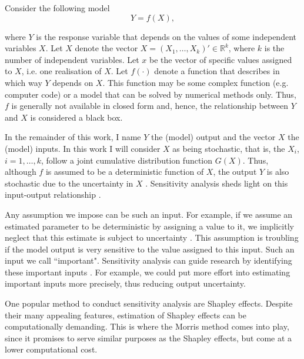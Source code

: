 
\noindent Consider the following model
\begin{equation*}
Y = f(X),
\end{equation*}

\noindent where $Y$ is the response variable that depends on the values of some independent variables $X$. Let $X$ denote the vector $X = (X_1, \dots, X_k)' \in \mathbb{R}^k$, where $k$ is the number of independent variables. Let $x$ be the vector of specific values assigned to $X$, i.e. one realisation of $X$. Let $f(\cdot)$ denote a function that describes in which way $Y$ depends on $X$. This function may be some complex function (e.g. computer code) or a model that can be solved by numerical methods only. Thus, $f$ is generally not available in closed form and, hence, the relationship between $Y$ and $X$ is considered a black box.

In the remainder of this work, I name $Y$ the (model) output and the vector $X$ the (model) inputs. In this work I will consider $X$ as being stochastic, that is, the $X_i$, $i = 1,\dots, k$, follow a joint cumulative distribution function $G(X)$. Thus, although $f$ is assumed to be a deterministic function of $X$, the output $Y$ is also stochastic due to the uncertainty in $X$ \citep{SNS16}. Sensitivity analysis sheds light on this input-output relationship \citep{BP16}.

Any assumption we impose can be such an input. For example, if we assume an estimated parameter to be deterministic by assigning a value to it, we implicitly neglect that this estimate is subject to uncertainty \citep{R21}. This assumption is troubling if the model output is very sensitive to the value assigned to this input. Such an input we call ``important". Sensitivity analysis can guide research by identifying these important inputs \citep{R21}. For example, we could put more effort into estimating important inputs more precisely, thus reducing output uncertainty.


One popular method to conduct sensitivity analysis are Shapley effects. Despite their many appealing features, estimation of Shapley effects can be computationally demanding. This is where the Morris method comes into play, since it promises to serve similar purposes as the Shapley effects, but come at a lower computational cost.


